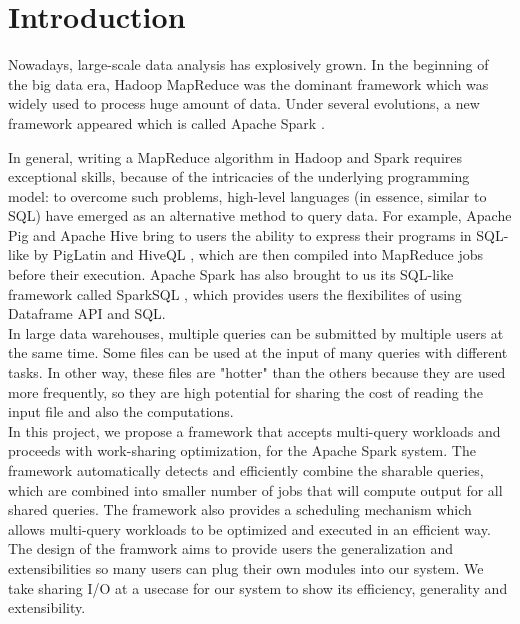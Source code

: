 
\chapter{Introduction} %

\label{Chapter1} %

Nowadays, large-scale data analysis has explosively grown. In the beginning of the big data era, Hadoop MapReduce \cite{hadoop} was the dominant framework which was widely used to process huge amount of data. Under several evolutions, a new framework appeared which is called Apache Spark \cite{spark}.

In general, writing a MapReduce \cite{Dean2004} algorithm in Hadoop and Spark requires exceptional skills, because of the intricacies of the underlying programming model: to overcome such problems, high-level languages (in essence, similar to SQL) have emerged as an alternative method to query data. For example, Apache Pig \cite{Gates2009} \cite{pig} and Apache Hive \cite{ashish2009} \cite{hive} bring to users the ability to express their programs in SQL-like by PigLatin \cite{Olston} and HiveQL \cite{ashish2009} , which are then compiled into MapReduce jobs before their execution. Apache Spark has also brought to us its SQL-like framework called SparkSQL \cite{michaelb}, which provides users the flexibilites of using Dataframe API and SQL.\\

In large data warehouses, multiple queries can be submitted by multiple users at the same time. Some files can be used at the input of many queries with different tasks. In other way, these files are "hotter" than the others because they are used more frequently, so they are high potential for sharing the cost of reading the input file and also the computations.\\

In this project, we propose a framework that accepts multi-query workloads and proceeds with work-sharing optimization, for the Apache Spark system. The framework automatically detects and efficiently combine the sharable queries, which are combined into smaller number of jobs that will compute output for all shared queries. The framework also provides a scheduling mechanism which allows multi-query workloads to be optimized and executed in an efficient way. The design of the framwork aims to provide users the generalization and extensibilities so many users can plug their own modules into our system. We take sharing I/O at a usecase for our system to show its efficiency, generality and extensibility.\\

